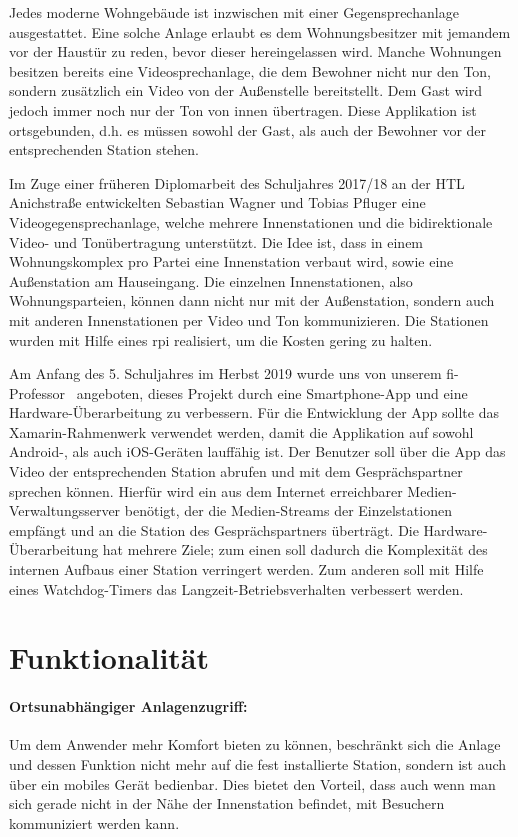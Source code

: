 Jedes moderne Wohngebäude ist inzwischen mit einer Gegensprechanlage ausgestattet.
Eine solche Anlage erlaubt es dem Wohnungsbesitzer mit jemandem vor der Haustür zu reden, bevor dieser hereingelassen wird.
Manche Wohnungen besitzen bereits eine Videosprechanlage, die dem Bewohner nicht nur den Ton, sondern zusätzlich ein Video von der Außenstelle bereitstellt.
Dem Gast wird jedoch immer noch nur der Ton von innen übertragen.
Diese Applikation ist ortsgebunden, d.h. es müssen sowohl der Gast, als auch der Bewohner vor der entsprechenden Station stehen.\par

Im Zuge einer früheren Diplomarbeit des Schuljahres 2017/18 an der HTL Anichstraße entwickelten Sebastian Wagner und Tobias Pfluger eine Videogegensprechanlage, welche mehrere Innenstationen und die bidirektionale Video- und Tonübertragung unterstützt.
Die Idee ist, dass in einem Wohnungskomplex pro Partei eine Innenstation verbaut wird, sowie eine Außenstation am Hauseingang.
Die einzelnen Innenstationen, also Wohnungsparteien, können dann nicht nur mit der Außenstation, sondern auch mit anderen Innenstationen per Video und Ton kommunizieren.
Die Stationen wurden mit Hilfe eines \ac{rpi} realisiert, um die Kosten gering zu halten.\par

Am Anfang des 5. Schuljahres im Herbst 2019 wurde uns von unserem \ac{fi}-Professor \MarioPrantl\ angeboten, dieses Projekt durch eine Smartphone-App und eine Hardware-Überarbeitung zu verbessern.
Für die Entwicklung der App sollte das Xamarin-Rahmenwerk verwendet werden, damit die Applikation auf sowohl Android-, als auch iOS-Geräten lauffähig ist. 
Der Benutzer soll über die App das Video der entsprechenden Station abrufen und mit dem Gesprächspartner sprechen können.
Hierfür wird ein aus dem Internet erreichbarer Medien-Verwaltungsserver benötigt, der die Medien-Streams der Einzelstationen empfängt und an die Station des Gesprächspartners überträgt.
Die Hardware-Überarbeitung hat mehrere Ziele; zum einen soll dadurch die Komplexität des internen Aufbaus einer Station verringert werden.
Zum anderen soll mit Hilfe eines Watchdog-Timers das Langzeit-Betriebsverhalten verbessert werden.

\section{Funktionalität}
\paragraph{Ortsunabhängiger Anlagenzugriff:}
Um dem Anwender mehr Komfort bieten zu können, beschränkt sich die Anlage und dessen Funktion nicht mehr auf die fest installierte Station, sondern ist auch über ein mobiles Gerät bedienbar.
Dies bietet den Vorteil, dass auch wenn man sich gerade nicht in der Nähe der Innenstation befindet, mit Besuchern kommuniziert werden kann.

